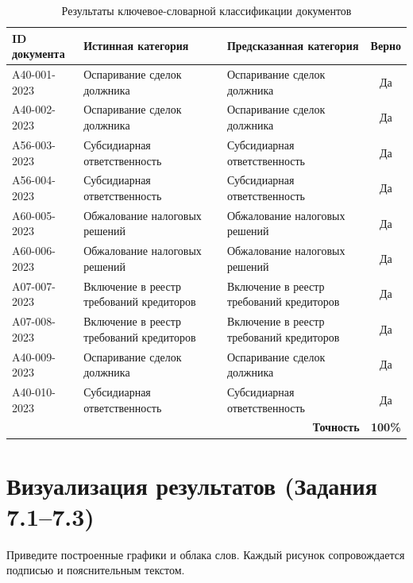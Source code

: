 \documentclass[12pt, a4paper]{report}
\begin{document}
\begin{table}[h]
  \centering
  \caption{Результаты ключевое-словарной классификации документов}
  \label{tab:classification}
  \begin{tabularx}{\textwidth}{l X X c}
    \toprule
    \rowcolor{LightBlue}
    \textsf{\textbf{ID документа}} &
    \textsf{\textbf{Истинная категория}} &
    \textsf{\textbf{Предсказанная категория}} &
    \textsf{\textbf{Верно}} \\
    \midrule
    A40-001-2023 & Оспаривание сделок должника & Оспаривание сделок должника & Да \\
    A40-002-2023 & Оспаривание сделок должника & Оспаривание сделок должника & Да \\
    A56-003-2023 & Субсидиарная ответственность & Субсидиарная ответственность & Да \\
    A56-004-2023 & Субсидиарная ответственность & Субсидиарная ответственность & Да \\
    A60-005-2023 & Обжалование налоговых решений & Обжалование налоговых решений & Да \\
    A60-006-2023 & Обжалование налоговых решений & Обжалование налоговых решений & Да \\
    A07-007-2023 & Включение в реестр требований кредиторов & Включение в реестр требований кредиторов & Да \\
    A07-008-2023 & Включение в реестр требований кредиторов & Включение в реестр требований кредиторов & Да \\
    A40-009-2023 & Оспаривание сделок должника & Оспаривание сделок должника & Да \\
    A40-010-2023 & Субсидиарная ответственность & Субсидиарная ответственность & Да \\
    \midrule
    \multicolumn{3}{r}{\textsf{\textbf{Точность}}} & \textbf{100\%} \\
    \bottomrule
  \end{tabularx}
\end{table}

\section{Визуализация результатов (Задания 7.1–7.3)}

Приведите построенные графики и облака слов. Каждый рисунок сопровождается
подписью и пояснительным текстом.
\end{document}
